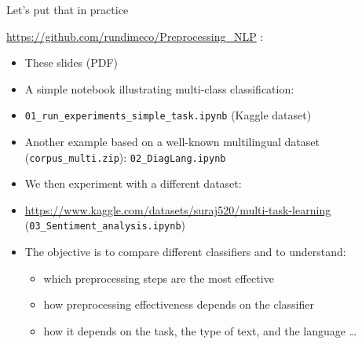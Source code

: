\begin{frame}{Let's put that in practice}

	\small{
\url{https://github.com/rundimeco/Preprocessing_NLP} :

	\begin{itemize}
\item These slides (PDF)
\item A simple notebook illustrating multi-class classification:
\item \texttt{01\_run\_experiments\_simple\_task.ipynb} (Kaggle dataset)
\item Another example based on a well-known multilingual dataset (\texttt{corpus\_multi.zip}):
      \texttt{02\_DiagLang.ipynb}
\item We then experiment with a different dataset:
\item \small{\url{https://www.kaggle.com/datasets/suraj520/multi-task-learning}} (\texttt{03\_Sentiment\_analysis.ipynb})
\item The objective is to compare different classifiers and to understand:
        \begin{itemize}
\item which preprocessing steps are the most effective
\item how preprocessing effectiveness depends on the classifier
\item how it depends on the task, the type of text, and the language \dots
\end{itemize}
\end{itemize}
	}
\end{frame}
